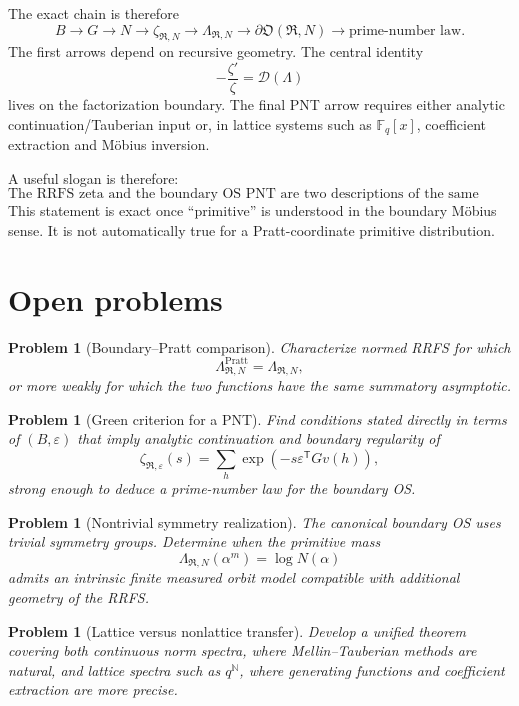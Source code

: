 \documentclass[11pt]{article}
\newtheorem{problem}[theorem]{Problem}
\newcommand{\NN}{\mathbb N}
\newcommand{\FF}{\mathbb F}
\newcommand{\cR}{\mathfrak R}
\newcommand{\cO}{\mathfrak O}
\begin{document}
The exact chain is therefore
\[
\boxed{
B\longrightarrow G\longrightarrow N
\longrightarrow
\zeta_{\cR,N}
\longrightarrow
\Lambda_{\cR,N}
\longrightarrow
\partial\cO(\cR,N)
\longrightarrow
\text{prime-number law}.}
\]
The first arrows depend on recursive geometry. The central identity
\[
-\frac{\zeta'}{\zeta}
=\mathcal D(\Lambda)
\]
lives on the factorization boundary. The final PNT arrow requires either analytic continuation/Tauberian input or, in lattice systems such as $\FF_q[x]$, coefficient extraction and M\"obius inversion.

A useful slogan is therefore:
\[
\boxed{
\text{The RRFS zeta and the boundary OS PNT are two descriptions of the same primitive boundary distribution.}}
\]
This statement is exact once ``primitive'' is understood in the boundary M\"obius sense. It is not automatically true for a Pratt-coordinate primitive distribution.

\section{Open problems}

\begin{problem}[Boundary--Pratt comparison]
Characterize normed RRFS for which
\[
\Lambda^{\mathrm{Pratt}}_{\cR,N}
=\Lambda_{\cR,N},
\]
or more weakly for which the two functions have the same summatory asymptotic.
\end{problem}

\begin{problem}[Green criterion for a PNT]
Find conditions stated directly in terms of $(B,\varepsilon)$ that imply analytic continuation and boundary regularity of
\[
\zeta_{\cR,\varepsilon}(s)
=\sum_h\exp\!\left(-s\varepsilon^{\mathsf T}Gv(h)\right),
\]
strong enough to deduce a prime-number law for the boundary OS.
\end{problem}

\begin{problem}[Nontrivial symmetry realization]
The canonical boundary OS uses trivial symmetry groups. Determine when the primitive mass
\[
\Lambda_{\cR,N}(\alpha^m)=\log N(\alpha)
\]
admits an intrinsic finite measured orbit model compatible with additional geometry of the RRFS.
\end{problem}

\begin{problem}[Lattice versus nonlattice transfer]
Develop a unified theorem covering both continuous norm spectra, where Mellin--Tauberian methods are natural, and lattice spectra such as $q^{\NN}$, where generating functions and coefficient extraction are more precise.
\end{problem}
\end{document}
